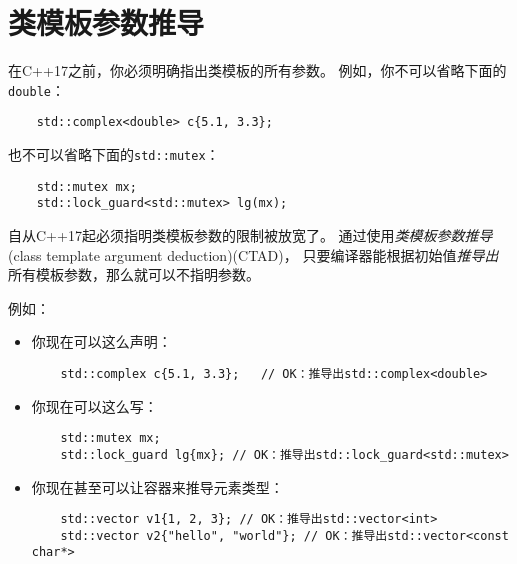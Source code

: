\chapter{类模板参数推导}\label{ch9}
在C++17之前，你必须明确指出类模板的所有参数。
例如，你不可以省略下面的\texttt{double}：
\begin{lstlisting}
    std::complex<double> c{5.1, 3.3};
\end{lstlisting}
也不可以省略下面的\texttt{std::mutex}：
\begin{lstlisting}
    std::mutex mx;
    std::lock_guard<std::mutex> lg(mx);
\end{lstlisting}
自从C++17起必须指明类模板参数的限制被放宽了。
通过使用\emph{类模板参数推导}(class template argument deduction)(CTAD)，
只要编译器能根据初始值\emph{推导出}所有模板参数，那么就可以不指明参数。

例如：
\begin{itemize}
    \item 你现在可以这么声明：
    \begin{lstlisting}
    std::complex c{5.1, 3.3};   // OK：推导出std::complex<double>
    \end{lstlisting}
    \item 你现在可以这么写：
    \begin{lstlisting}
    std::mutex mx;
    std::lock_guard lg{mx}; // OK：推导出std::lock_guard<std::mutex>
    \end{lstlisting}
    \item 你现在甚至可以让容器来推导元素类型：
    \begin{lstlisting}
    std::vector v1{1, 2, 3}; // OK：推导出std::vector<int>
    std::vector v2{"hello", "world"}; // OK：推导出std::vector<const char*>
    \end{lstlisting}
\end{itemize}

